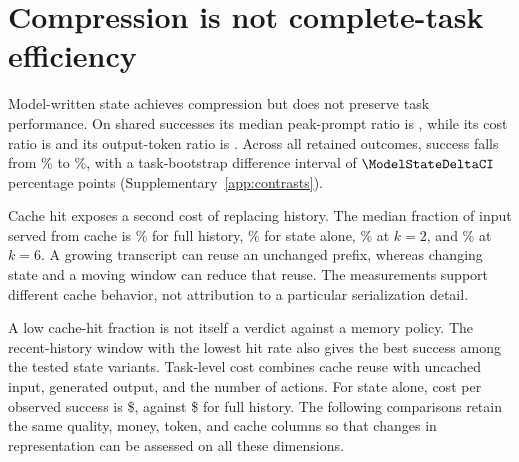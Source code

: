 \section{Compression is not complete-task efficiency}
\label{sec:economics}
Model-written state achieves compression but does not preserve task
performance. On shared successes its median peak-prompt ratio is
\ModelStatePeakRatio{}, while its cost ratio is \ModelStateCostRatio{}
and its output-token ratio is \ModelStateOutputRatio{}.
Across all retained outcomes, success falls from \ModelControlRate\% to
\ModelStateRate\%, with a task-bootstrap difference interval of
$\ModelStateDeltaCI$ percentage points (Supplementary~\ref{app:contrasts}).

Cache hit exposes a second cost of replacing history. The median fraction
of input served from cache is \ModelControlCacheHit\% for full history,
\ModelStateCacheHit\% for state alone, \ModelHistoryTwoCacheHit\% at $k=2$,
and \ModelHistorySixCacheHit\% at $k=6$.
A growing transcript can reuse an unchanged prefix, whereas changing
state and a moving window can reduce that reuse. The measurements support
different cache behavior, not attribution to a particular serialization
detail.

A low cache-hit fraction is not itself a verdict against a memory policy.
The recent-history window with the lowest hit rate also gives the best
success among the tested state variants. Task-level cost combines cache
reuse with uncached input, generated output, and the number of actions.
For state alone, cost per observed success is
\$\ModelStateCostPerSuccess{}, against
\$\ModelControlCostPerSuccess{} for full history.
The following comparisons retain the same quality, money, token, and
cache columns so that changes in representation can be assessed on all
these dimensions.
